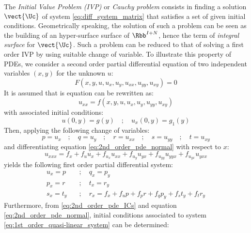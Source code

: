 The \textit{Initial Value Problem (IVP)} or \textit{Cauchy problem} consists in finding a solution $\vect{\Uc}$ of system \eqref{eq:diff_system_matrix} that satisfies a set of given initial conditions. Geometrically speaking, the solution of such a problem can be seen as the building of an hyper-surface surface of $\Rbb^{I+N}$, hence the term of \textit{integral surface} for $\vect{\Uc}$. Such a problem can be reduced to that of solving a first order IVP by using suitable change of variable. To illustrate this property of PDEs, we consider a second order partial differential equation of two independent variables $(x,y)$ for the unknown $u$:
\begin{equation}
  \label{eq:2nd_order_pde}
  F(x,y,u,u_x,u_y,u_{xx},u_{yy},u_{xy})=0
\end{equation}
It is assumed that is equation can be rewritten as:
\begin{equation}
  \label{eq:2nd_order_pde_normal}
  u_{xx}= f(x,y,u,u_x,u_y,u_{yy},u_{xy})
\end{equation}
with associated initial conditions:
\begin{equation}
  \label{eq:2nd_order_pde_ICs}
  u(0,y)= g(y) \quad ; \quad u_x(0,y)= g_1(y)
\end{equation}
Then, applying the following change of variables:
\begin{equation*}
  \label{eq:change_of_variables}
  p = u_x \quad  ; \quad   q = u_{y}  \quad   ; \quad    r = u_{xx} \quad   ; \quad  s = u_{yy} \quad;\quad   t = u_{xy} 
\end{equation*}
and differentiating equation \eqref{eq:2nd_order_pde_normal} with respect to $x$:
\begin{equation*}
  \label{eq:r_x}
  u_{xxx}= f_x + f_u u_x + f_{u_x}u_{xx} + f_{u_y}u_{yx} + f_{u_{yy}}u_{yyx}+f_{u_{yx}}u_{yxx}
\end{equation*}
yields the following first order partial differential system:
\begin{equation}
  \label{eq:1st_order_quasi-linear_system}
  \begin{aligned}
    u_x  = p \quad & ; \quad    q_x  = p_y \\
    p_x  = r \quad &;\quad     t_x  = r_y \\
    s_x  = t_y \quad &;\quad   r_x  = f_x + f_up + f_p r + f_q p_y + f_s t_y + f_t r_y
  \end{aligned}
\end{equation}
Furthermore, from \eqref{eq:2nd_order_pde_ICs} and equation \eqref{eq:2nd_order_pde_normal}, initial conditions associated to system \eqref{eq:1st_order_quasi-linear_system} can be determined:
